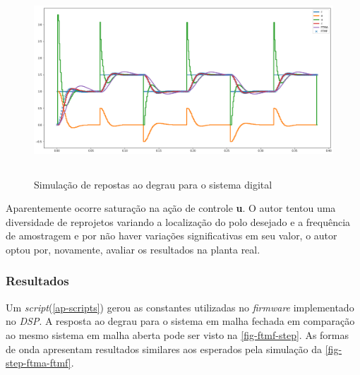 \documentclass[
	12pt,				%
	article,			%
	openright,			%
	oneside,
	a4paper,			%
	chapter=TITLE,		%
	section=TITLE,		%
	english,			%
	french,				%
	spanish,			%
	brazil,				%
]{abntex2}
\begin{document}
                \FloatBarrier
                \begin{figure}[htbp]
                	\centering
                	\caption{Simulação de repostas ao degrau para o sistema digital}
                	\includegraphics[width=\textwidth,height=240px,keepaspectratio]{imgs/ftmf/step-recursive.png}
                	\label{fig-step-recursive}
            	\end{figure}
                \FloatBarrier
                
                Aparentemente ocorre saturação na ação de controle \textbf{u}. O autor tentou uma diversidade de reprojetos variando a localização do polo desejado e a frequência de amostragem e por não haver variações significativas em seu valor, o autor optou por, novamente, avaliar os resultados na planta real.
            
            \subsubsection{Resultados}
            
                Um \textit{script}(\autoref{ap-scripts}) gerou as constantes utilizadas no \textit{firmware} implementado no \textit{DSP}. A resposta ao degrau para o sistema em malha fechada em comparação ao mesmo sistema em malha aberta pode ser visto na \autoref{fig-ftmf-step}.
                As formas de onda apresentam resultados similares aos esperados pela simulação da \autoref{fig-step-ftma-ftmf}.
                
\end{document}
